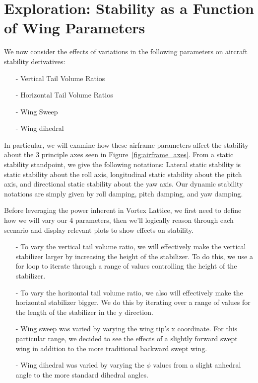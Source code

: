 \documentclass{article}
\begin{document}
\section{Exploration: Stability as a Function of Wing Parameters}
We now consider the effects of variations in the following parameters on aircraft stability derivatives:
\begin{itemize}
    \item[-] Vertical Tail Volume Ratios
    \item[-] Horizontal Tail Volume Ratios
    \item[-] Wing Sweep
    \item[-] Wing dihedral
\end{itemize}

In particular, we will examine how these airframe parameters affect the stability about the 3 principle axes seen in Figure~\ref{fig:airframe_axes}. 
From a static stability standpoint, we give the following notations: Lateral static stability is static stability about the roll axis, longitudinal static stability about the pitch axis, and directional static stability about the yaw axis.
Our dynamic stability notations are simply given by roll damping, pitch damping, and yaw damping.

Before leveraging the power inherent in Vortex Lattice, we first need to define how we will vary our 4 parameters, then we'll logically reason through each scenario and display relevant plots to show effects on stability.

\begin{itemize}
    \item[-] To vary the vertical tail volume ratio, we will effectively make the vertical stabilizer larger by increasing the height of the stabilizer. To do this, we use a for loop to iterate through a range of values controlling the height of the stabilizer.
    \item[-] To vary the horizontal tail volume ratio, we also will effectively make the horizontal stabilizer bigger. We do this by iterating over a range of values for the length of the stabilizer in the y direction.
    \item[-] Wing sweep was varied by varying the wing tip's x coordinate. For this particular range, we decided to see the effects of a slightly forward swept wing in addition to the more traditional backward swept wing.
    \item[-] Wing dihedral was varied by varying the $\phi$ values from a slight anhedral angle to the more standard dihedral angles.

\end{itemize}
\end{document}
